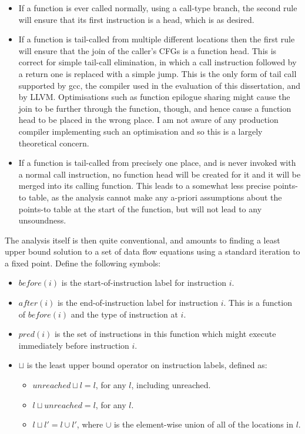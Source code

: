 \begin{itemize}
\item
  If a function is ever called normally, using a call-type branch, the
  second rule will ensure that its first instruction is a head,
  which is as desired.
\item
  If a function is tail-called from multiple different locations then
  the first rule will ensure that the join of the caller's CFGs is a
  function head.  This is correct for simple tail-call elimination, in
  which a call instruction followed by a return one is replaced with a
  simple jump.  This is the only form of tail call supported by gcc,
  the compiler used in the evaluation of this dissertation, and by
  LLVM.  Optimisations such
  as function epilogue sharing\needCite{} might cause the join to be
  further through the function, though, and hence cause a function
  head to be placed in the wrong place.  I am not aware of any
  production compiler implementing such an optimisation and so this is
  a largely theoretical concern.
\item
  If a function is tail-called from precisely one place, and is never
  invoked with a normal call instruction, no function head will be
  created for it and it will be merged into its calling function.
  This leads to a somewhat less precise points-to table, as the
  analysis cannot make any a-priori assumptions about the points-to
  table at the start of the function, but will not lead to any
  unsoundness.
\end{itemize}

The analysis itself is then quite conventional, and amounts to finding
a least upper bound solution to a set of data flow equations using a
standard iteration to a fixed point.  Define the following symbols:

\begin{itemize}
\item $before(i)$ is the start-of-instruction label for instruction
  $i$.
\item $after(i)$ is the end-of-instruction label for instruction $i$.
  This is a function of $before(i)$ and the type of instruction at
  $i$.
\item $pred(i)$ is the set of instructions in this function which
  might execute immediately before instruction $i$.
\item $\sqcup$ is the least upper bound operator on instruction
  labels, defined as:

  \begin{itemize}
  \item $unreached {\sqcup} l = l$, for any $l$, including unreached.
  \item $l {\sqcup} unreached = l$, for any $l$.
  \item $l {\sqcup} l' = l \cup l'$, where $\cup$ is the element-wise
    union of all of the locations in $l$.
  \end{itemize}
\end{itemize}

